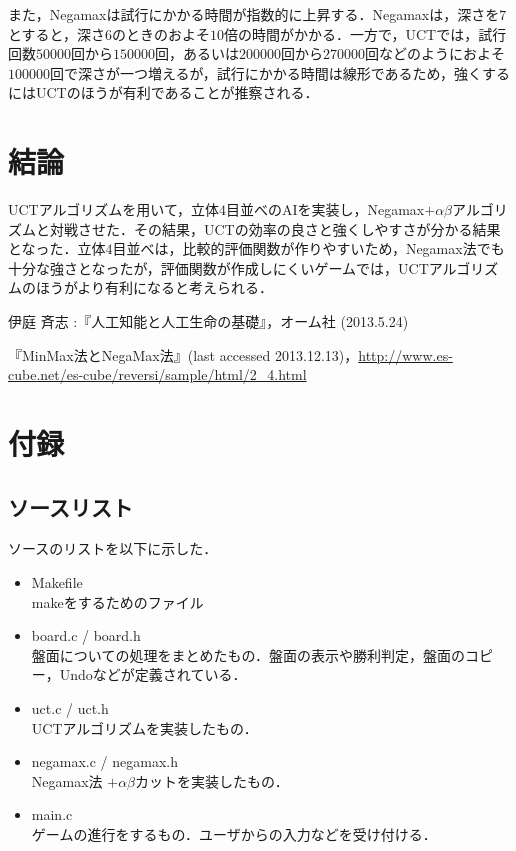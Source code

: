 \documentclass{jarticle}
\begin{document}
また，Negamaxは試行にかかる時間が指数的に上昇する．Negamaxは，深さを$7$とすると，深さ$6$のときのおよそ$10$倍の時間がかかる．一方で，UCTでは，試行回数$50000$回から$150000$回，あるいは$200000$回から$270000$回などのようにおよそ$100000$回で深さが一つ増えるが，試行にかかる時間は線形であるため，強くするにはUCTのほうが有利であることが推察される．


\section{結論}
UCTアルゴリズムを用いて，立体$4$目並べのAIを実装し，Negamax$+\alpha \beta$アルゴリズムと対戦させた．その結果，UCTの効率の良さと強くしやすさが分かる結果となった．立体$4$目並べは，比較的評価関数が作りやすいため，Negamax法でも十分な強さとなったが，評価関数が作成しにくいゲームでは，UCTアルゴリズムのほうがより有利になると考えられる．


\begin{thebibliography}{n}
伊庭 斉志 :『人工知能と人工生命の基礎』，オーム社 (2013.5.24)

『MinMax法とNegaMax法』(last accessed 2013.12.13)，\url{http://www.es-cube.net/es-cube/reversi/sample/html/2_4.html}

\end{thebibliography}

\section*{付録}
\subsection*{ソースリスト}
ソースのリストを以下に示した．

\begin{itemize}
	\item Makefile \\
		makeをするためのファイル
	\item board.c / board.h \\
		盤面についての処理をまとめたもの．盤面の表示や勝利判定，盤面のコピー，Undoなどが定義されている．
	\item uct.c / uct.h \\
		UCTアルゴリズムを実装したもの．
	\item negamax.c / negamax.h \\
		Negamax法 $ + \alpha \beta$カットを実装したもの．
	\item main.c \\
		ゲームの進行をするもの．ユーザからの入力などを受け付ける．
\end{itemize}
\end{document}
